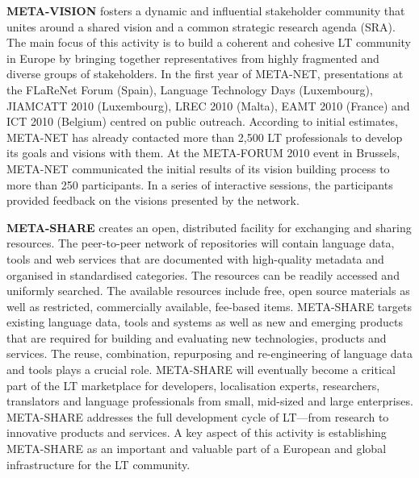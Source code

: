 \documentclass[]{../../metanetpaper}
\begin{document}
\begin{multicols}{2}

\textbf{META-VISION} fosters a dynamic and influential stakeholder
community that unites around a shared vision and a common strategic
research agenda (SRA). The main focus of this activity is to build a
coherent and cohesive LT community in Europe by bringing together
representatives from highly fragmented and diverse groups of
stakeholders. In the first year of META-NET, presentations at the
FLaReNet Forum (Spain), Language Technology Days (Luxembourg),
JIAMCATT 2010 (Luxembourg), LREC 2010 (Malta), EAMT 2010 (France) and
ICT 2010 (Belgium) centred on public outreach. According to initial
estimates, META-NET has already contacted more than 2,500 LT
professionals to develop its goals and visions with them. At the
META-FORUM 2010 event in Brussels, META-NET communicated the initial
results of its vision building process to more than 250
participants. In a series of interactive sessions, the participants
provided feedback on the visions presented by the network.

\textbf{META-SHARE} creates an open, distributed facility for
exchanging and sharing resources. The peer-to-peer network of
repositories will contain language data, tools and web services that
are documented with high-quality metadata and organised in
standardised categories. The resources can be readily accessed and
uniformly searched. The available resources include free, open source
materials as well as restricted, commercially available, fee-based
items. META-SHARE targets existing language data, tools and systems as
well as new and emerging products that are required for building and
evaluating new technologies, products and services. The reuse,
combination, repurposing and re-engineering of language data and tools
plays a crucial role. META-SHARE will eventually become a critical
part of the LT marketplace for developers, localisation experts,
researchers, translators and language professionals from small,
mid-sized and large enterprises. META-SHARE addresses the full
development cycle of LT—from research to innovative products and
services. A key aspect of this activity is establishing META-SHARE as
an important and valuable part of a European and global infrastructure
for the LT community.


\end{multicols}
\end{document}
